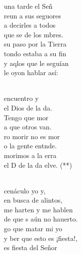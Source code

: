 \documentclass[12pt]{article}
\begin{document}
\begin{multicols*}{2}
        \begin{cancion}%
             una tarde el Señ \\
            reun a sus seguores\\
            a decirles a todos\\
            que se  de los mbres.\\
             su paso por la Tierra\\
            tondo estaba a su fin\\
            y aqlos que le seguían\\
            le oyon hablar así:\\\jump\\
            \begin{chorus}%
             encuentro y\\
             el Dios de la da.\\
            Tengo que mor\\
            a que otros van.\\
            ro morir no es mor\\
            o la gente entnde.\\
            morimos a la erra\\
            el D de la da elve. (**)\\
            \end{chorus}%
            \jump\\
             cenáculo yo y,\\
             en busca de alintos,\\
             me harten y me hablen\\
            de que s aún no hauerto.\\
            go que matar mi yo\\
            y ber que esto es ¡fiesta!,\\
            es fiesta del Señor\\

\end{cancion}
\end{multicols*}
\end{document}
